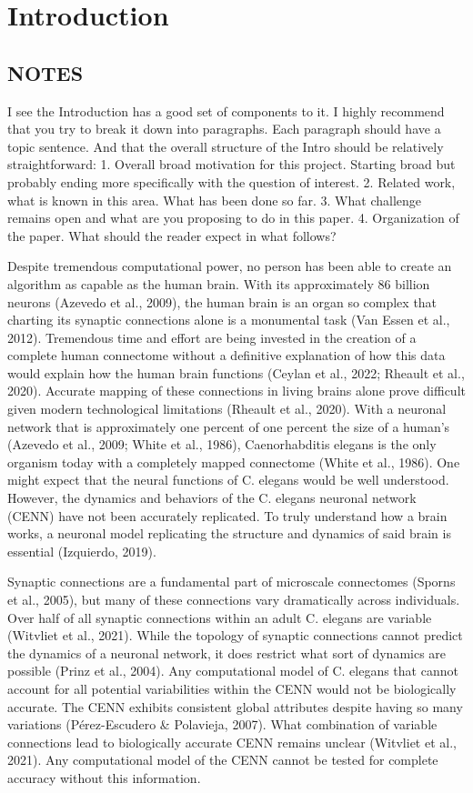\section{Introduction}

\subsection{NOTES}
I see the Introduction has a good set of components to it. I highly recommend that you try to break it down into paragraphs. Each paragraph should have a topic sentence. And that the overall structure of the Intro should be relatively straightforward:
1. Overall broad motivation for this project. Starting broad but probably ending more specifically with the question of interest. 
2. Related work, what is known in this area. What has been done so far. 
3. What challenge remains open and what are you proposing to do in this paper. 
4. Organization of the paper. What should the reader expect in what follows? 

Despite tremendous computational power, no person has been able to create an algorithm as capable as the human brain. With its approximately 86 billion neurons (Azevedo et al., 2009), the human brain is an organ so complex that charting its synaptic connections alone is a monumental task (Van Essen et al., 2012). Tremendous time and effort are being invested in the creation of a complete human connectome without a definitive explanation of how this data would explain how the human brain functions (Ceylan et al., 2022; Rheault et al., 2020). Accurate mapping of these connections in living brains alone prove difficult given modern technological limitations (Rheault et al., 2020). With a neuronal network that is approximately one percent of one percent the size of a human’s (Azevedo et al., 2009; White et al., 1986), Caenorhabditis elegans is the only organism today with a completely mapped connectome (White et al., 1986). One might expect that the neural functions of C. elegans would be well understood. However, the dynamics and behaviors of the C. elegans neuronal network (CENN) have not been accurately replicated. To truly understand how a brain works, a neuronal model replicating the structure and dynamics of said brain is essential (Izquierdo, 2019).

Synaptic connections are a fundamental part of microscale connectomes (Sporns et al., 2005), but many of these connections vary dramatically across individuals. Over half of all synaptic connections within an adult C. elegans are variable (Witvliet et al., 2021). While the topology of synaptic connections cannot predict the dynamics of a neuronal network, it does restrict what sort of dynamics are possible (Prinz et al., 2004). Any computational model of C. elegans that cannot account for all potential variabilities within the CENN would not be biologically accurate. The CENN exhibits consistent global attributes despite having so many variations (Pérez-Escudero \& Polavieja, 2007). What combination of variable connections lead to biologically accurate CENN remains unclear (Witvliet et al., 2021). Any computational model of the CENN cannot be tested for complete accuracy without this information. 


